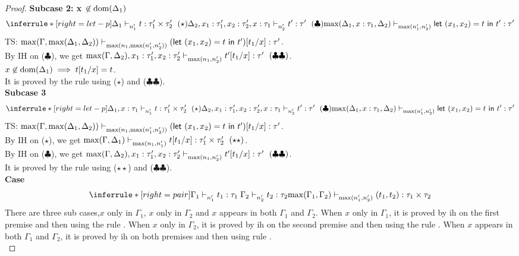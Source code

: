 \documentclass{article}
\begin{document}
\begin{proof}
\textbf{Subcase 2: x $\not \in \text{dom}(\Delta_1)$ }
\[
   \inferrule*[ right = let-p ]
   {\Delta_1 \jtype{n_1'}{}{t}{\tau_1' \times \tau_2'}~(\star) \\ \Delta_2, x_1:\tau_1', x_2: \tau_2' , x: \tau_1 \jtype{n_2'}{}{t'}{\tau'}~(\clubsuit)}
   {  \max(\Delta_1, x: \tau_1, \Delta_2) \jtype{\max(n_1',n_2')}{}{\letx{(x_1,x_2)}{t}{t'}}{\tau'}  }
\]
 TS: $ \max(\Gamma, \max(\Delta_1,\Delta_2) ) \mathrel{\vdash_{\max(n_1,\max(n_1',n_2') )}^{} {  (\mathrel{ \mathsf{let}\ {(x_1,x_2)} = {t} \ \mathsf{in} \ {t'} })[t_1/x] } : {\tau'}}  $. \\
By IH on ($\clubsuit$), we get $\max(\Gamma, \Delta_2), x_1:\tau_1', x_2: \tau_2'  \mathrel{\vdash_{\max(n_1,n_2') }^{} {t'[t_1/x]} : {\tau'}}~(\clubsuit\clubsuit) $. \\
 $x \not \in \text{dom}(\Delta_1) \implies t[t_1/x] = t $.\\
It is proved by the rule  using ($\star$) and ($\clubsuit\clubsuit$). \\

\textbf{Subcase 3 }
\[
    \inferrule*[ right = let-p ]
   {\Delta_1 , x: \tau_1 \jtype{n_1'}{}{t}{\tau_1' \times \tau_2'}~(\star) \\ \Delta_2, x_1:\tau_1', x_2: \tau_2' , x: \tau_1 \jtype{n_2'}{}{t'}{\tau'}~(\clubsuit)}
   {  \max(\Delta_1, x: \tau_1, \Delta_2) \jtype{\max(n_1',n_2')}{}{\letx{(x_1,x_2)}{t}{t'}}{\tau'}  }
\]
TS: $ \max(\Gamma, \max(\Delta_1,\Delta_2) ) \mathrel{\vdash_{\max(n_1,\max(n_1',n_2') )}^{} {  (\mathrel{ \mathsf{let}\ {(x_1,x_2)} = {t} \ \mathsf{in} \ {t'} } )[t_1/x] } : {\tau'}}  $. \\
By IH on ($\star$), we get $\max(\Gamma, \Delta_1) \jtype{\max(n_1,n_1') }{}{t[t_1/x]}{\tau_1' \times \tau_2'}~(\star\star) $. \\
By IH on ($\clubsuit$), we get $\max(\Gamma, \Delta_2),x_1: \tau_1', x_2:\tau_2' \mathrel{\vdash_{\max(n_1,n_2') }^{} {t'[t_1/x]} : {\tau'}}~(\clubsuit\clubsuit) $. \\
It is proved by the rule  using ($\star\star$) and ($\clubsuit\clubsuit$).\\


\noindent \textbf{Case} 
\[
     \inferrule*[right = pair]
   {\Gamma_1 \jtype{n_1'}{}{t_1}{\tau_1} \\ \Gamma_2 \jtype{n_2'}{}{t_2}{\tau_2}}
   { \max(\Gamma_1, \Gamma_2)  \jtype{\max(n_1',n_2')}{}{(t_1, t_2)}{\tau_1 \times \tau_2}  }
\]
There are three sub cases,$x$ only in $\Gamma_1$,  $x$ only in $\Gamma_2$ and $x$  appears in both $\Gamma_1$ and $\Gamma_2$. When $x$ only in $\Gamma_1$, it is proved by ih on the first premise and then using the rule . When $x$ only in $\Gamma_2$, it is proved by ih on the second premise and then using the rule . When $x$  appears in both $\Gamma_1$ and $\Gamma_2$, it is proved by ih on both premises and then using rule .\\


\end{proof}
\end{document}
